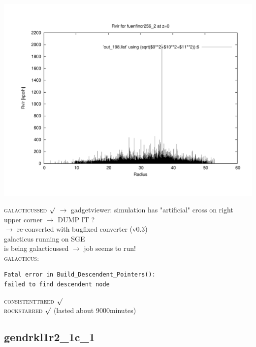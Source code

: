 \includegraphics[scale=0.3]{fuenfincr256_2/plot_rvir_z0.pdf}

\textsc{galacticussed} $\surd$
$\rightarrow$ gadgetviewer: simulation has "artificial" cross on right upper corner $\rightarrow$ DUMP IT ? \\
$\rightarrow$ re-converted with bugfixed converter (v0.3) \\
galacticus running on SGE \\
is being galacticussed $\rightarrow$ job seems to run! \\
 \textsc{galacticus}:
 \begin{verbatim}
Fatal error in Build_Descendent_Pointers():
failed to find descendent node 
\end{verbatim}
\textsc{consistenttreed} $\surd$ \\ 
\textsc{rockstarred} $\surd$ (lasted about 9000minutes) \\

% 
%
%
%
%
%
%
%



\newpage
\subsection{gendrkl1r2\_1c\_1}

